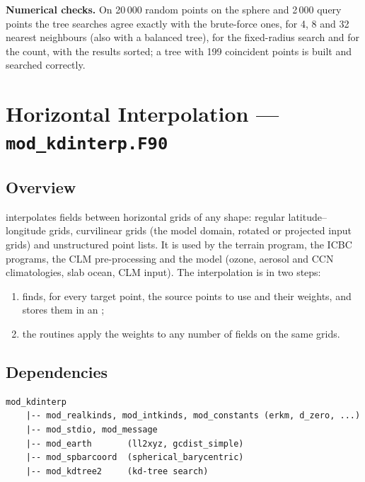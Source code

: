 \textbf{Numerical checks.} On 20\,000 random points on the sphere and 2\,000
query points the tree searches agree exactly with the brute-force ones, for
4, 8 and 32 nearest neighbours (also with a balanced tree), for the
fixed-radius search and for the count, with the results sorted; a tree with
199 coincident points is built and searched correctly.

\section{Horizontal Interpolation --- \texttt{mod\_kdinterp.F90}}
\label{sec:kdinterp}

\subsection{Overview}

 interpolates fields between horizontal grids of any
shape: regular latitude--longitude grids, curvilinear grids (the model
domain, rotated or projected input grids) and unstructured point lists. It
is used by the terrain program, the ICBC programs, the CLM pre-processing and
the model (ozone, aerosol and CCN climatologies, slab ocean, CLM input). The
interpolation is in two steps:
\begin{enumerate}
  \item {} finds, for every target point, the
        source points to use and their weights, and stores them in an
        ;
  \item the  routines apply the weights to any
        number of fields on the same grids.
\end{enumerate}

\subsection{Dependencies}

\begin{lstlisting}
mod_kdinterp
    |-- mod_realkinds, mod_intkinds, mod_constants (erkm, d_zero, ...)
    |-- mod_stdio, mod_message
    |-- mod_earth       (ll2xyz, gcdist_simple)
    |-- mod_spbarcoord  (spherical_barycentric)
    |-- mod_kdtree2     (kd-tree search)
\end{lstlisting}


